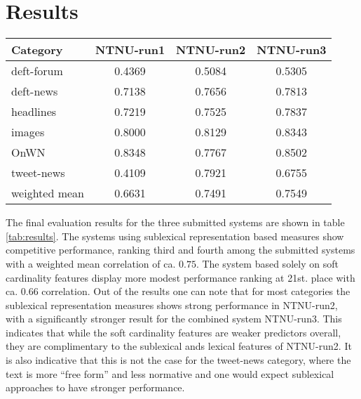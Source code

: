 
\section{Results}
\label{sec:results}

\begin{table*}
  \centering
  \begin{tabular}{|l|c|c|c|}
    \hline
    Category & NTNU-run1 & NTNU-run2 & NTNU-run3 \\
    \hline
    deft-forum & 0.4369 & 0.5084 & 0.5305 \\
    deft-news & 0.7138 & 0.7656 & 0.7813 \\
    headlines & 0.7219 & 0.7525 & 0.7837 \\
    images & 0.8000 & 0.8129 & 0.8343 \\
    OnWN & 0.8348 & 0.7767 & 0.8502 \\
    tweet-news & 0.4109 & 0.7921 & 0.6755	\\
    \hline
    weighted mean & 0.6631 & 0.7491 & 0.7549 \\
    \hline
  \end{tabular}
  \caption{Final evaluation results for the submitted systems.}
  \label{tab:results}
\end{table*}

The final evaluation results for the three submitted systems are shown in table \ref{tab:results}. The systems using sublexical representation based measures show competitive performance, ranking third and fourth among the submitted systems with a weighted mean correlation of ca. $0.75$. The system based solely on soft cardinality features display more modest performance ranking at 21st. place with ca. 0.66 correlation. Out of the results one can note that for most categories the sublexical representation measures shows strong performance in NTNU-run2, with a significantly stronger result for the combined system NTNU-run3. This indicates that while the soft cardinality features are weaker predictors overall, they are complimentary to the sublexical ands lexical features of NTNU-run2. It is also indicative that this is not the case for the tweet-news category, where the text is more ``free form'' and less normative and one would expect sublexical approaches to have stronger performance.

